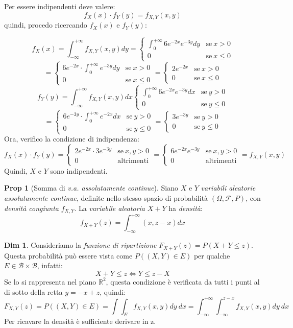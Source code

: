 \documentclass[12pt, a4paper]{report}
\theoremstyle{definition}
\newtheorem*{demonstration}{Dim}
\newtheorem*{proposition}{Prop}
\DeclareRobustCommand{\F}{\mathcal{F}}%
\DeclareRobustCommand{\R}{\mathbb{R}}%
\DeclareRobustCommand{\B}{\mathcal{B}}%
\DeclareRobustCommand{\probspace}{(\Omega,\F,P)}
\begin{document}
Per essere indipendenti deve valere:
\[f_X(x)\cdot f_Y(y)=f_{X,Y}(x,y)\]
quindi, procedo ricercando $f_X(x)$ e $f_Y(y)$:

\[f_X(x)=\int_{-\infty}^{+\infty}f_{X,Y}(x,y)dy=\begin{cases}
	{\int_{0}^{+\infty}6e^{-2x}e^{-3y}dy} & \text{se}\ {x>0}\\
	{0} & \text{se}\ {x\leq 0}
\end{cases}\]
\[=\begin{cases}
	{6e^{-2x}\cdot \int_{0}^{+\infty}e^{-3y}dy} & \text{se}\ {x>0}\\
	{0} & \text{se}\ {x\leq 0}
\end{cases}=\begin{cases}
	{2e^{-2x}} & \text{se}\ {x>0}\\
	{0} & \text{se}\ {x\leq 0}
\end{cases}\]
\[f_Y(y)=\int_{-\infty}^{+\infty}f_{X,Y}(x,y)dx\begin{cases}
	{\int_{0}^{+\infty}6e^{-2x}e^{-3y}dx} & \text{se}\ {y>0}\\
	{0} & \text{se}\ {y\leq 0}
\end{cases}\]
\[=\begin{cases}
	{6e^{-3y}\cdot \int_{0}^{+\infty}e^{-2x}dx} & \text{se}\ {y>0}\\
	{0} & \text{se}\ {y\leq 0}
\end{cases}=\begin{cases}
	{3e^{-3y}} & \text{se}\ {y>0}\\
	{0} & \text{se}\ {y\leq 0}
\end{cases}\]
Ora, verifico la condizione di indipendenza:
\[f_X(x)\cdot f_Y(y)=\begin{cases}
	{2e^{-2x}\cdot 3e^{-3y}} & \text{se}\ {x,y>0}\\
	{0} & \text{altrimenti}
\end{cases}=\begin{cases}
	{6e^{-2x}e^{-3y}} & \text{se}\ {x,y>0}\\
	{0} & \text{altrimenti}
\end{cases}=f_{X,Y}(x,y)\]
Quindi, $X$ e $Y$ sono indipendenti.

\begin{proposition}[Somma di \emph{v.a. assolutamente continue}]
	Siano $X$ e $Y$ \emph{variabili aleatorie assolutamente continue}, definite
	nello stesso spazio di probabilità $\probspace$, con \emph{densità congiunta}
	$f_{X,Y}$. La \emph{variabile aleatoria} $X+Y$ ha \emph{densità}:
	\[f_{X+Y}(z)=\int_{-\infty}^{+\infty}(x,z-x)dx\]
\end{proposition}
\begin{demonstration}
	Consideriamo la \emph{funzione di ripartizione} $F_{X+Y}(z)=P(X+Y\leq z)$.
	Questa probabilità può essere vista come \(P((X,Y)\in E)\) per qualche \(E
	\in\B\times\B\), infatti:
	\[X+Y\leq z\Leftrightarrow Y\leq z-X\]
	Se lo si rappresenta nel piano $\R^2$, questa condizione è verificata da tutti
	i punti al di sotto della retta \(y=-x+z\), quindi:
	\[F_{X,Y}(z)=P((X,Y)\in E)=\int\int_Ef_{X,Y}(x,y)dy\ dx=\int_{-\infty}^
	{+\infty}\int_{-\infty}^{z-x}f_{X,Y}(x,y)dy\ dx\]
	Per ricavare la densità è sufficiente derivare in z.
\end{demonstration}
\end{document}

